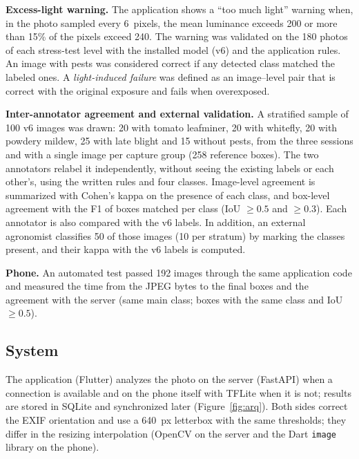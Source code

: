 \documentclass[sensors,article,submit,pdftex,moreauthors]{Definitions/mdpi}
\begin{document}
{\color{blue} \textbf{Excess-light warning.} The application shows a ``too much light'' warning when, in the photo sampled every 6~pixels, the mean luminance exceeds 200 or more than 15\% of the pixels exceed 240.} {\color{blue} The warning was validated on the 180 photos of each stress-test level with the installed model (v6) and the application rules.} {\color{blue} An image with pests was considered correct if any detected class matched the labeled ones.} {\color{blue} A \emph{light-induced failure} was defined as an image--level pair that is correct with the original exposure and fails when overexposed.}

{\color{blue} \textbf{Inter-annotator agreement and external validation.}\label{sec:acuerdo} A stratified sample of 100 v6 images was drawn:} {\color{blue} 20 with tomato leafminer, 20 with whitefly, 20 with powdery mildew, 25 with late blight and 15 without pests, from the three sessions and with a single image per capture group (258 reference boxes).} {\color{blue} The two annotators relabel it independently, without seeing the existing labels or each other's, using the written rules and four classes.} {\color{blue} Image-level agreement is summarized with Cohen's kappa on the presence of each class, and box-level agreement with the F1 of boxes matched per class (IoU $\geq 0.5$ and $\geq 0.3$).} {\color{blue} Each annotator is also compared with the v6 labels.} {\color{blue} In addition, an external agronomist classifies 50 of those images (10 per stratum) by marking the classes present, and their kappa with the v6 labels is computed.}

{\color{blue} \textbf{Phone.} An automated test passed 192 images through the same application code and measured the time from the JPEG bytes to the final boxes and the agreement with the server (same main class; boxes with the same class and IoU $\geq 0.5$).}

\subsection{\color{blue} System}

{\color{blue} The application (Flutter) analyzes the photo on the server (FastAPI) when a connection is available and on the phone itself with TFLite when it is not; results are stored in SQLite and synchronized later (Figure~\ref{fig:arq}).} {\color{blue} Both sides correct the EXIF orientation and use a 640~px letterbox with the same thresholds; they differ in the resizing interpolation (OpenCV on the server and the Dart \texttt{image} library on the phone).}
\end{document}
